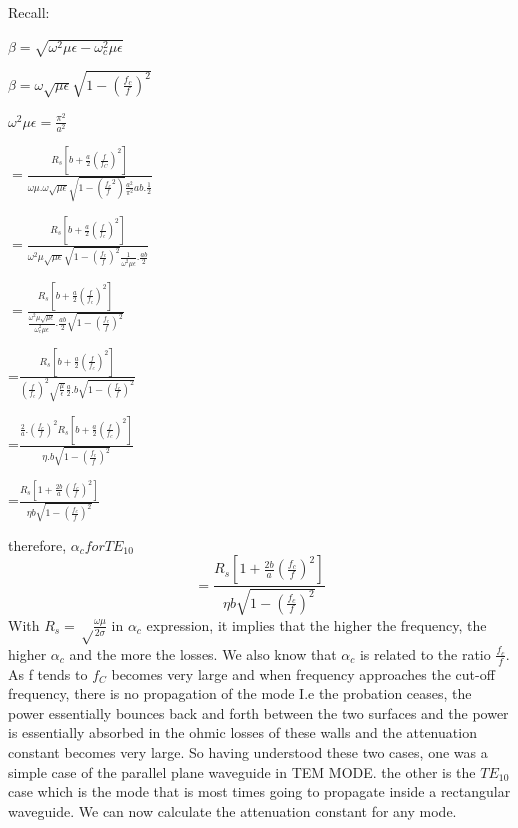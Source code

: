 Recall:
\begin{center}
$\beta=\sqrt{\omega^2\mu\epsilon-\omega_c^2\mu\epsilon}$	
\end{center}
\begin{center}
$\beta=\omega\sqrt{\mu\epsilon}\sqrt{1-(\frac{f_c}{f})^2}$	
\end{center}
\begin{center}
$\omega^2\mu\epsilon=\frac{\pi^2}{a^2}$	
\end{center}
\begin{center}
$=\frac{R_s[b+\frac{a}{2}(\frac{f}{f_C})^2]}{\omega\mu.\omega\sqrt{\mu\epsilon}\sqrt{1-(\frac{f_c}{f}^2)}\frac{a^2}{\pi^2}ab.\frac{1}{2}}$	
\end{center}
\begin{center}
$=\frac{R_s[b+\frac{a}{2}(\frac{f}{f_c})^2]}{\omega^2\mu\sqrt{\mu\epsilon}\sqrt{1-(\frac{f_c}{f})^2}\frac{1}{\omega^2\mu\epsilon}.\frac{ab}{2}}$	
\end{center}
\begin{center}
$=\frac{R_s[b+\frac{a}{2}(\frac{f}{f_c})^2]}{\frac{\omega^2\mu\sqrt{\mu\epsilon}}{\omega_c^2\mu\epsilon}.\frac{ab}{2}\sqrt{1-(\frac{f_c}{f})^2}}$	
\end{center}
\begin{center}
=$\frac{R_s[b+\frac{a}{2}(\frac{f}{f_c})^2]}{(\frac{f}{f_c})^2\sqrt{\frac{\mu}{\epsilon}}\frac{a}{2}.b\sqrt{1-(\frac{f_c}{f})^2}}$	
\end{center}
\begin{center}
=$\frac{\frac{2}{a}.(\frac{f_c}{f})^2R_s[b+\frac{a}{2}(\frac{f}{f_c})^2]}{\eta.b\sqrt{1-(\frac{f_c}{f})^2}}$	
\end{center}
\begin{center}
=$\frac{R_s[1+\frac{2b}{a}(\frac{f_c}{f})^2]}{\eta b\sqrt{1-(\frac{f_c}{f})^2}}$	
\end{center}
therefore,
$\alpha_{c} for TE_{10}$
\begin{equation}
=\frac{R_s[1+\frac{2b}{a}(\frac{f_c}{f})^2]}{\eta b\sqrt{1-(\frac{f_c}{f})^2}}	
\end{equation}
With $R_s=\sqrt\frac{\omega\mu}{2\sigma}$ in $\alpha_{c}$ expression, it implies that the higher the frequency, the higher $\alpha_{c}$ and the more the losses. We also know that $\alpha_{c}$ is related to the ratio $\frac{f_c}{f}$. As f tends to $f_C$ becomes very large and when frequency approaches the cut-off frequency, there is no propagation of the mode I.e the probation ceases, the power essentially bounces back and forth between the two surfaces and the power is essentially absorbed in the ohmic losses of these walls and the attenuation constant becomes very large. 
So having understood these two cases, one was a simple case of the parallel plane waveguide in TEM MODE. the other is the $TE_{10}$ case which is the mode that is most times going to propagate inside a rectangular waveguide. We can now calculate the attenuation constant for any mode.  

